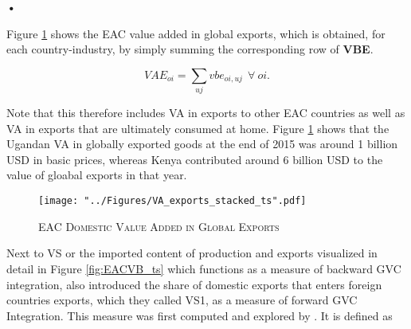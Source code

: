 \textbf{\textbf{•}}\documentclass[a4paper]{article}
\begin{document}


Figure \ref{fig:VAexp} shows the EAC value added in global exports, which is obtained, for each country-industry, by simply summing the corresponding row of \textbf{VBE}.

\begin{equation} \label{eq:VAE}
VAE_{oi} = \sum_{uj} vbe_{oi, uj}\ \ \forall\ oi.
\end{equation}

 Note that this therefore includes VA in exports to other EAC countries as well as VA in exports that are ultimately consumed at home. Figure \ref{fig:VAexp} shows that the Ugandan VA in globally exported goods at the end of 2015 was around 1 billion USD in basic prices, whereas Kenya contributed around 6 billion USD to the value of gloabal exports in that year. 


\begin{figure}[h!]
\centering
\caption{\label{fig:VAexp}\textsc{EAC Domestic Value Added in Global Exports}}
\texttt{[image: "../Figures/VA\_exports\_stacked\_ts".pdf]} %
\end{figure}
\FloatBarrier

Next to VS or the imported content of production and exports visualized in detail in Figure \ref{fig:EACVB_ts} which functions as a measure of backward GVC integration, \citet{hummels2001nature} also introduced the share of domestic exports that enters foreign countries exports, which they called VS1, as a measure of forward GVC Integration. This measure was first computed and explored by \citet{daudin2011produces}. It is defined as 
\end{document}
